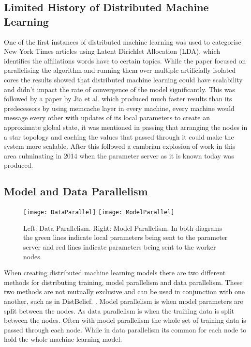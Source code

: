 \subsection{Limited History of Distributed Machine Learning}


One of the first instances of distributed machine learning was used to
categorise New York Times articles using Latent Dirichlet Allocation (LDA),
which identifies the affiliations words have to certain topics.
\cite{newman2008distributed} While the paper focused on parallelising the
algorithm and running them over multiple artificially isolated cores the results
showed that distributed machine learning could have scalability and didn’t
impact the rate of convergence of the model significantly. This was followed by
a paper by Jia et al. \cite{ParallelTopicModels} which produced much faster
results than its predecessors by using memcache layer in every machine, every
machine would message every other with updates of its local parameters
to create an approximate global state, it was mentioned in passing that
arranging the nodes in a star topology and caching the values that passed
through it could make the system more scalable. After this followed a cambrian
explosion of work in this area \cite{Ahmed2012YahooLDA, li2014communication,
Dean2012Distbelief, googlemapreduce2008} culminating in 2014 when the parameter
server as it is known today \cite{LI2014ParameterServers} was produced.


\subsection{Model and Data Parallelism}
\begin{figure}[h]
    \centering
    \texttt{[image: DataParallel]}
    \texttt{[image: ModelParallel]}
    \caption{Left: Data Parallelism. Right: Model Parallelism. In both diagrams
        the green lines indicate local parameters being sent to the parameter
        server and red lines indicate parameters being sent to the worker nodes.}
\end{figure}
When creating distributed machine learning models there are two different methods
for distributing training, model parallelism and data parallelism. These two
methods are not mutually exclusive and can be used in conjunction with one
another, such as in DistBelief. \cite{Dean2012Distbelief}. Model parallelism is
when model parameters are split between the nodes. As data parallelism is when
the training data is split between the nodes. \cite{Xing2015Petuum} Often with model
parallelism the whole set of training data is passed through each node. While in
data parallelism its common for each node to hold the whole machine learning
model.

